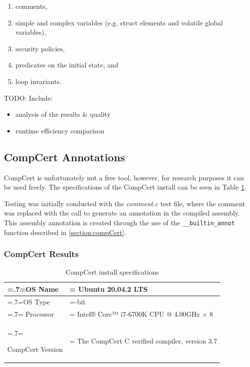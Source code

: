 \documentclass[twocolumn]{article}
\begin{document}
\begin{enumerate}
    \item comments,
    \item simple and complex variables (e.g. struct elements and volatile global variables),
    \item security policies,
    \item predicates on the initial state, and
    \item loop invariants.
\end{enumerate}

TODO: Include:
\begin{itemize}
    \item analysis of the results \& quality
    \item runtime efficiency comparison
\end{itemize}

\subsection{CompCert Annotations}
CompCert is unfortunately not a free tool, however, for research purposes it can be used freely. The specifications of the CompCert install can be seen in Table \ref{table:compcertInstall}. 

Testing was initially conducted with the \textit{comment.c} test file, where the comment was replaced with the call to generate an annotation in the compiled assembly. This assembly annotation is created through the use of the \texttt{\_\_builtin\_annot} function described in \ref{section:compCert}.

\subsubsection{CompCert Results}

\begin{table}
    \begin{center}
        \begin{tabularx}{\linewidth} { 
            | >{\hsize=.7\hsize\linewidth=\hsize}X 
            | >{\hsize=1.3\hsize\linewidth=\hsize}X  | }
            \hline
            OS Name & Ubuntu 20.04.2 LTS \\
            \hline
            OS Type & 64-bit \\
            \hline
            Processor & Intel® Core™ i7-6700K CPU @ 4.00GHz × 8 \\
            \hline
            \raggedright
            CompCert Version & The CompCert C verified compiler, version 3.7 \\
            \hline
        \end{tabularx}
    \end{center}
    \caption{CompCert install specifications}
    \label{table:compcertInstall}
\end{table}

\clearpage
\printbibliography
\clearpage


\end{document}

